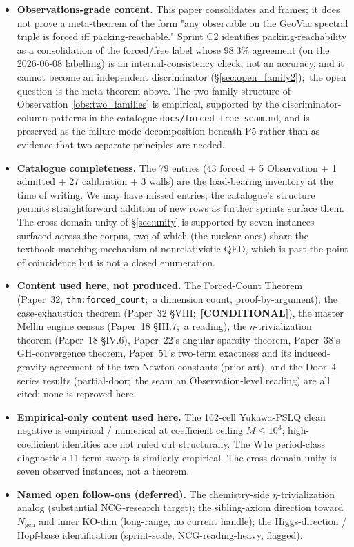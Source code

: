 \documentclass[11pt,a4paper]{article}
\theoremstyle{plain}
\theoremstyle{definition}
\newcommand{\Ngen}{N_{\mathrm{gen}}}
\begin{document}
\begin{itemize}
  \item \textbf{Observations-grade content.}  This paper consolidates and frames; it does not prove a meta-theorem of the form "any observable on the GeoVac spectral triple is forced iff packing-reachable."  Sprint C2 identifies packing-reachability as a consolidation of the forced/free label whose 98.3\% agreement (on the 2026-06-08 labelling) is an internal-consistency check, not an accuracy, and it cannot become an independent discriminator (\S\ref{sec:open_family2});\ the open question is the meta-theorem above.  The two-family structure of Observation~\ref{obs:two_families} is empirical, supported by the discriminator-column patterns in the catalogue \texttt{docs/forced\_free\_seam.md}, and is preserved as the failure-mode decomposition beneath P5 rather than as evidence that two separate principles are needed.
  \item \textbf{Catalogue completeness.}  The 79 entries (43 forced + 5 Observation + 1 admitted + 27 calibration + 3 walls) are the load-bearing inventory at the time of writing. We may have missed entries; the catalogue's structure permits straightforward addition of new rows as further sprints surface them. The cross-domain unity of \S\ref{sec:unity} is supported by seven instances surfaced across the corpus, two of which (the nuclear ones) share the textbook matching mechanism of nonrelativistic QED, which is past the point of coincidence but is not a closed enumeration.
  \item \textbf{Content used here, not produced.}  The Forced-Count Theorem (Paper~32, \texttt{thm:forced\_count};\ a dimension count, proof-by-argument), the case-exhaustion theorem (Paper~32 \S VIII;\ \textbf{[CONDITIONAL]}), the master Mellin engine census (Paper~18 \S III.7;\ a reading), the $\eta$-trivialization theorem (Paper~18 \S IV.6), Paper~22's angular-sparsity theorem, Paper~38's GH-convergence theorem, Paper~51's two-term exactness and its induced-gravity agreement of the two Newton constants (prior art), and the Door~4 series results (partial-door;\ the seam an Observation-level reading) are all cited; none is reproved here.
  \item \textbf{Empirical-only content used here.}  The 162-cell Yukawa-PSLQ clean negative is empirical / numerical at coefficient ceiling $M \le 10^3$; high-coefficient identities are not ruled out structurally. The W1e period-class diagnostic's 11-term sweep is similarly empirical. The cross-domain unity is seven observed instances, not a theorem.
  \item \textbf{Named open follow-ons (deferred).}  The chemistry-side $\eta$-trivialization analog (substantial NCG-research target); the sibling-axiom direction toward $\Ngen$ and inner KO-dim (long-range, no current handle); the Higgs-direction / Hopf-base identification (sprint-scale, NCG-reading-heavy, flagged).
\end{itemize}
\end{document}

